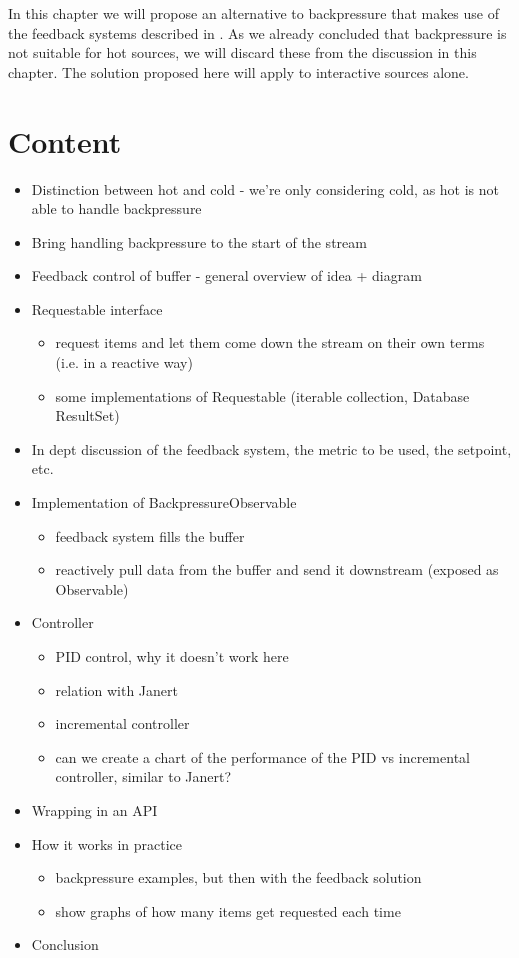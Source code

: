 In this chapter we will propose an alternative to backpressure that makes use of the feedback systems described in . As we already concluded that backpressure is not suitable for hot sources, we will discard these from the discussion in this chapter. The solution proposed here will apply to interactive sources alone.



\clearpage
\section*{Content}
\begin{itemize}
	\item[\checkmark] Distinction between hot and cold - we're only considering cold, as hot is not able to handle backpressure
	\item[\checkmark] Bring handling backpressure to the start of the stream
	\item[\checkmark] Feedback control of buffer - general overview of idea + diagram
	\item[\checkmark] Requestable interface
		\begin{itemize}
			\item[\checkmark] request items and let them come down the stream on their own terms (i.e. in a reactive way)
			\item[\checkmark] some implementations of Requestable (iterable collection, Database ResultSet)
		\end{itemize}
	\item[\checkmark] In dept discussion of the feedback system, the metric to be used, the setpoint, etc.
	\item[\checkmark] Implementation of BackpressureObservable
		\begin{itemize}
			\item[\checkmark] feedback system fills the buffer
			\item[\checkmark] reactively pull data from the buffer and send it downstream (exposed as Observable)
		\end{itemize}
	\item Controller
		\begin{itemize}
			\item PID control, why it doesn't work here
			\item relation with Janert
			\item incremental controller
			\item can we create a chart of the performance of the PID vs incremental controller, similar to Janert?
		\end{itemize}
	\item Wrapping in an API
	\item How it works in practice
		\begin{itemize}
			\item backpressure examples, but then with the feedback solution
			\item show graphs of how many items get requested each time
		\end{itemize}
	\item Conclusion
\end{itemize}